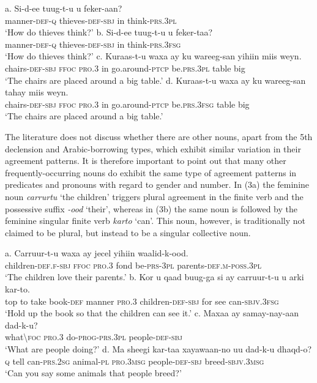 \documentclass[output=paper]{langsci/langscibook}
\begin{document}
\ea
\ea
\gll a. Si-d-ee             tuug-t-u             u  feker-aan?\\
       manner-\textsc{def-q} thieves-\textsc{def-sbj} in think-\textsc{prs.3pl}\\
\glt ‘How do thieves think?’
\ex
\gll b. Si-d-ee             tuug-t-u             u  feker-taa?\\
       manner-\textsc{def-q} thieves-\textsc{def-sbj} in think-\textsc{prs.3fsg}\\
\glt ‘How do thieves think?’
\ex
\gll c. Kuraas-t-u      waxa  ay     ku wareeg-san       yihiin         miis weyn.\\
       chairs-\textsc{def-sbj ffoc pro.3} in go.around\textsc{{}-ptcp }be\textsc{.prs.3pl} table big\\
\glt ‘The chairs are placed around a big table.’ 
\ex
\gll d. Kuraas-t-u      waxa  ay     ku wareeg-san       tahay           miis weyn.\\
       chairs-\textsc{def-sbj ffoc pro.3} in go.around\textsc{{}-ptcp }be\textsc{.prs.3fsg} table big\\
\glt ‘The chairs are placed around a big table.’ 
\z
\z

The literature does not discuss whether there are other nouns, apart from the 5th declension and Arabic-borrowing types, which exhibit similar variation in their agreement patterns. It is therefore important to point out that many other frequently-occurring nouns do exhibit the same type of agreement patterns in predicates and pronouns with regard to gender and number. In (3a) the feminine noun \textit{carrurtu} ‘the children’ triggers plural agreement in the finite verb and the possessive suffix \textit{{}-ood} ‘their’, whereas in (3b) the same noun is followed by the feminine singular finite verb \textit{karto} ‘can’. This noun, however, is traditionally not claimed to be plural, but instead to be a singular collective noun.

\ea
\ea
\gll a. Carruur-t-u          waxa ay      jecel  yihiin           waalid-k-ood.\\
       children-\textsc{def.f-sbj ffoc pro.3 }fond  be\textsc{{}-prs-3pl} parents-\textsc{def.m}{}-\textsc{poss.3pl}\\
\glt ‘The children love their parents.’
\ex
\gll b. Kor u qaad buug-ga  si          ay      carruur-t-u          u   arki kar-to.\\
     top to take book-\textsc{def} manner \textsc{pro.3} children-\textsc{def-sbj} for see can-\textsc{sbjv.3fsg}\\
\glt ‘Hold up the book so that the children can see it.’
\ex
\gll c. Maxaa     ay          samay-nay-aan     dad-k-u?\\
       what{\textbackslash}\textsc{foc pro.3}  do-\textsc{prog-prs.3pl}  people\textsc{{}-def-sbj}\\
\glt ‘What are people doing?’
\ex
\gll d. Ma sheegi kar-taa         xayawaan-no  uu        dad-k-u             dhaqd-o?\\
       \textsc{q}     tell     can-\textsc{prs.2sg} animal\textsc{{}-pl  pro.3msg}  people\textsc{{}-def-sbj} breed-\textsc{sbjv.3msg}\\
\glt ‘Can you say some animals that people breed?’
\z
\z
\end{document}
